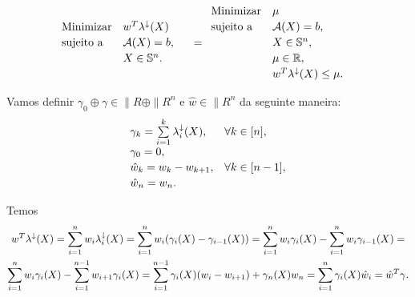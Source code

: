 \begin{homeworkProblemAnswer}
\begin{equation}\label{eq:prob_ex2}
    \begin{array}[!h]{lll}
        \text{Minimizar} & w^T \eigen(X)                                    & \\[2pt]
        \text{sujeito a} & \"{A}(X) = b,                                    & \\[2pt]
                         & X \in \|{S}^n.                                   & \\
    \end{array}
    =
    \begin{array}[!h]{lll}
        \text{Minimizar} & \mu                                              & \\[2pt]
        \text{sujeito a} & \"{A}(X) = b,                                    & \\[2pt]
                         & X \in \|{S}^n,                                   & \\[2pt]
                         & \mu \in \|{R},                                   & \\[2pt]
                         & w^T \eigen(X) \leq \mu.                          & \\
    \end{array}
\end{equation}

Vamos definir $\gamma_0 \oplus \gamma \in \|{R} \oplus \|{R}^n$ e $\hat{w} \in \|{R}^n$ da seguinte maneira:
\begin{equation*}
    \begin{array}[!h]{ll}
        \gamma_k = \sum \limits_{i=1}^k \eigen_i(X), & \forall k \in [n], \\[2pt]
        \gamma_0 = 0,                                & \\[2pt]
        \hat{w}_k = w_k - w_{k+1},                   & \forall k \in [n-1], \\[2pt]
        \hat{w}_n = w_n.                             & \\
    \end{array}
\end{equation*}

Temos
\begin{multline*}  
    w^T \lambda^{\downarrow}(X) = 
    \sum \limits_{i=1}^n w_i \lambda^{\downarrow}_i(X) = 
    \sum \limits_{i=1}^n w_i (\gamma_i(X) - \gamma_{i-1}(X)) = 
    \sum \limits_{i=1}^n w_i \gamma_i(X) - \sum \limits_{i=1}^{n} w_i \gamma_{i-1}(X) = \\
    \sum \limits_{i=1}^n w_i \gamma_i(X) - \sum \limits_{i=1}^{n-1} w_{i+1} \gamma_{i}(X) =
    \sum \limits_{i=1}^{n-1} \gamma_i(X)(w_i - w_{i+1}) + \gamma_n(X)w_n =
    \sum \limits_{i=1}^n \gamma_i(X) \hat{w}_i =
    \hat{w}^T \gamma.
\end{multline*}


\end{homeworkProblemAnswer}
